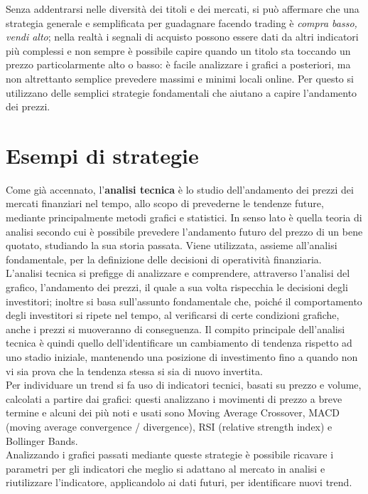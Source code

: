 \documentclass[a4paper,12pt]{report}
\begin{document}










Senza addentrarsi nelle diversità dei titoli e dei mercati, si può affermare che una strategia generale e semplificata per guadagnare facendo trading è \textit{compra basso, vendi alto}; nella realtà i segnali di acquisto possono essere dati da altri indicatori più complessi e non sempre è possibile capire quando un titolo sta toccando un prezzo particolarmente alto o basso: è facile analizzare i grafici a posteriori, ma non altrettanto semplice prevedere massimi e minimi locali online. Per questo si utilizzano delle semplici strategie fondamentali che aiutano a capire l'andamento dei prezzi.


\section{Esempi di strategie}
Come già accennato, l'\textbf{analisi tecnica} è lo studio dell'andamento dei prezzi dei mercati finanziari nel tempo, allo scopo di prevederne le tendenze future, mediante principalmente metodi grafici e statistici. In senso lato è quella teoria di analisi secondo cui è possibile prevedere l'andamento futuro del prezzo di un bene quotato, studiando la sua storia passata. Viene utilizzata, assieme all'analisi fondamentale, per la definizione delle decisioni di operatività finanziaria.\\
L'analisi tecnica si prefigge di analizzare e comprendere, attraverso l'analisi del grafico, l'andamento dei prezzi, il quale a sua volta rispecchia le decisioni degli investitori; inoltre si basa sull'assunto fondamentale che, poiché il comportamento degli investitori si ripete nel tempo, al verificarsi di certe condizioni grafiche, anche i prezzi si muoveranno di conseguenza. Il compito principale dell'analisi tecnica è quindi quello dell'identificare un cambiamento di tendenza rispetto ad uno stadio iniziale, mantenendo una posizione di investimento fino a quando non vi sia prova che la tendenza stessa si sia di nuovo invertita.\\
Per individuare un trend si fa uso di indicatori tecnici, basati su prezzo e volume, calcolati a partire dai grafici: questi analizzano i movimenti di prezzo a breve termine e alcuni dei più noti e usati sono Moving Average Crossover, MACD (moving average convergence / divergence), RSI (relative strength index) e Bollinger Bands.\\
Analizzando i grafici passati mediante queste strategie è possibile ricavare i parametri per gli indicatori che meglio si adattano al mercato in analisi e riutilizzare l'indicatore, applicandolo ai dati futuri, per identificare nuovi trend.\\~\\
\end{document}
